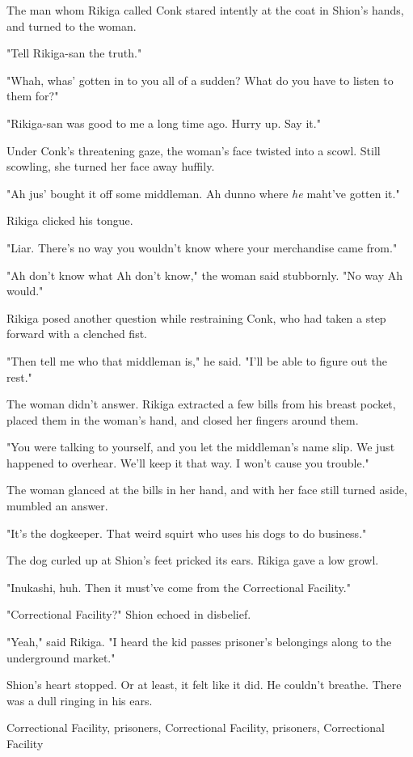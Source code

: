 The man whom Rikiga called Conk stared intently at the coat in Shion's
hands, and turned to the woman.

"Tell Rikiga-san the truth."

"Whah, whas' gotten in to you all of a sudden? What do you have to
listen to them for?"

"Rikiga-san was good to me a long time ago. Hurry up. Say it."

Under Conk's threatening gaze, the woman's face twisted into a scowl.
Still scowling, she turned her face away huffily.

"Ah jus' bought it off some middleman. Ah dunno where \emph{he} maht've gotten
it."

Rikiga clicked his tongue.

"Liar. There's no way you wouldn't know where your merchandise came
from."

"Ah don't know what Ah don't know," the woman said stubbornly. "No way
Ah would."

Rikiga posed another question while restraining Conk, who had taken a
step forward with a clenched fist.

"Then tell me who that middleman is," he said. "I'll be able to figure
out the rest."

The woman didn't answer. Rikiga extracted a few bills from his breast
pocket, placed them in the woman's hand, and closed her fingers around
them.

"You were talking to yourself, and you let the middleman's name slip. We
just happened to overhear. We'll keep it that way. I won't cause you
trouble."

The woman glanced at the bills in her hand, and with her face still
turned aside, mumbled an answer.

"It's the dogkeeper. That weird squirt who uses his dogs to do
business."

The dog curled up at Shion's feet pricked its ears. Rikiga gave a low
growl.

"Inukashi, huh. Then it must've come from the Correctional Facility."

"Correctional Facility?" Shion echoed in disbelief.

"Yeah," said Rikiga. "I heard the kid passes prisoner's belongings along
to the underground market."

Shion's heart stopped. Or at least, it felt like it did. He couldn't
breathe. There was a dull ringing in his ears.

Correctional Facility, prisoners, Correctional Facility, prisoners,
Correctional Facility\el 

